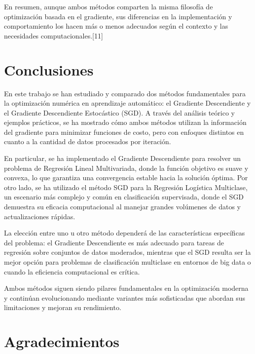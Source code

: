 \documentclass[12pt, letterpaper,conference]{IEEEtran}
\begin{document}
\vspace{0.15cm}
En resumen, aunque ambos métodos comparten la misma filosofía de optimización basada en el gradiente, sus diferencias en la implementación y comportamiento los hacen más o menos adecuados según el contexto y las necesidades computacionales.[11]


\vspace{0.25cm}

\section{Conclusiones}

En este trabajo se han estudiado y comparado dos métodos fundamentales para la optimización numérica en aprendizaje automático: el Gradiente Descendiente y el Gradiente Descendiente Estocástico (SGD). A través del análisis teórico y ejemplos prácticos, se ha mostrado cómo ambos métodos utilizan la información del gradiente para minimizar funciones de costo, pero con enfoques distintos en cuanto a la cantidad de datos procesados por iteración.

En particular, se ha implementado el Gradiente Descendiente para resolver un problema de Regresión Lineal Multivariada, donde la función objetivo es suave y convexa, lo que garantiza una convergencia estable hacia la solución óptima. Por otro lado, se ha utilizado el método SGD para la Regresión Logística Multiclase, un escenario más complejo y común en clasificación supervisada, donde el SGD demuestra su eficacia computacional al manejar grandes volúmenes de datos y actualizaciones rápidas.

La elección entre uno u otro método dependerá de las características específicas del problema: el Gradiente Descendiente es más adecuado para tareas de regresión sobre conjuntos de datos moderados, mientras que el SGD resulta ser la mejor opción para problemas de clasificación multiclase en entornos de big data o cuando la eficiencia computacional es crítica.

Ambos métodos siguen siendo pilares fundamentales en la optimización moderna y continúan evolucionando mediante variantes más sofisticadas que abordan sus limitaciones y mejoran su rendimiento.


\vspace{0.25cm}

\section*{Agradecimientos}
\end{document}
